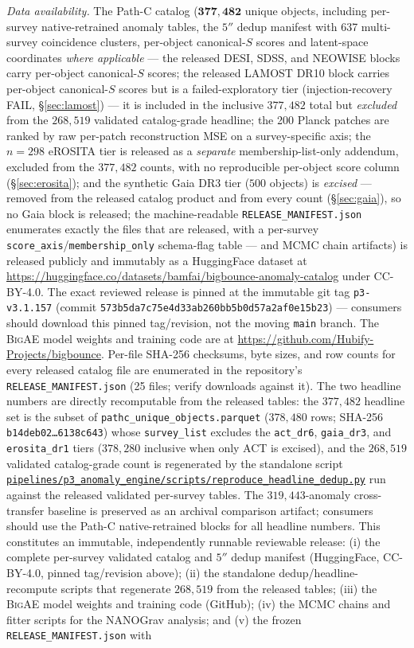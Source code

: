 \documentclass[aps,prd,twocolumn,superscriptaddress,showpacs,preprintnumbers,nofootinbib,longbibliography,floatfix]{revtex4-2}
\newcommand{\repoBase}{https://github.com/Hubify-Projects/bigbounce/blob/main}
\newcommand{\artifact}[1]{\href{\repoBase/#1}{\nolinkurl{#1}}}
\newcommand{\BigAE}{\textsc{BigAE}}
\begin{document}
\begin{acknowledgments}
\textit{Data availability.} The Path-C catalog ($\mathbf{377{,}482}$ unique objects, including per-survey native-retrained anomaly tables, the $5''$ dedup manifest with 637 multi-survey coincidence clusters, per-object canonical-$S$ scores and latent-space coordinates \emph{where applicable} --- the released DESI, SDSS, and NEOWISE blocks carry per-object canonical-$S$ scores; the released LAMOST DR10 block carries per-object canonical-$S$ scores but is a failed-exploratory tier (injection-recovery FAIL, \S\ref{sec:lamost}) --- it is included in the inclusive $377{,}482$ total but \emph{excluded} from the $268{,}519$ validated catalog-grade headline; the 200 Planck patches are ranked by raw per-patch reconstruction MSE on a survey-specific axis; the $n=298$ eROSITA tier is released as a \emph{separate} membership-list-only addendum, excluded from the $377{,}482$ counts, with no reproducible per-object score column (\S\ref{sec:erosita}); and the synthetic Gaia DR3 tier ($500$ objects) is \emph{excised} --- removed from the released catalog product and from every count (\S\ref{sec:gaia}), so no Gaia block is released; the machine-readable \texttt{RELEASE\_MANIFEST.json} enumerates exactly the files that are released, with a per-survey \texttt{score\_axis}/\texttt{membership\_only} schema-flag table --- and MCMC chain artifacts) is released publicly and immutably as a HuggingFace dataset at \url{https://huggingface.co/datasets/bamfai/bigbounce-anomaly-catalog} under CC-BY-4.0. The exact reviewed release is pinned at the immutable git tag \texttt{p3-v3.1.157} (commit \texttt{573b5da7c75e4d33ab260bb5b0d57a2af0e15b23}) --- consumers should download this pinned tag/revision, not the moving \texttt{main} branch. The \BigAE{} model weights and training code are at \url{https://github.com/Hubify-Projects/bigbounce}. Per-file SHA-256 checksums, byte sizes, and row counts for every released catalog file are enumerated in the repository's \texttt{RELEASE\_MANIFEST.json} (25 files; verify downloads against it). The two headline numbers are directly recomputable from the released tables: the $377{,}482$ headline set is the subset of \texttt{pathc\_unique\_objects.parquet} ($378{,}480$ rows; SHA-256 \texttt{b14deb02\ldots6138c643}) whose \texttt{survey\_list} excludes the \texttt{act\_dr6}, \texttt{gaia\_dr3}, and \texttt{erosita\_dr1} tiers ($378{,}280$ inclusive when only ACT is excised), and the $268{,}519$ validated catalog-grade count is regenerated by the standalone script \artifact{pipelines/p3\_anomaly\_engine/scripts/reproduce\_headline\_dedup.py} run against the released validated per-survey tables. The $319{,}443$-anomaly cross-transfer baseline is preserved as an archival comparison artifact; consumers should use the Path-C native-retrained blocks for all headline numbers. This constitutes an immutable, independently runnable reviewable release: (i) the complete per-survey validated catalog and $5''$ dedup manifest (HuggingFace, CC-BY-4.0, pinned tag/revision above); (ii) the standalone dedup/headline-recompute scripts that regenerate $268{,}519$ from the released tables; (iii) the \BigAE{} model weights and training code (GitHub); (iv) the MCMC chains and fitter scripts for the NANOGrav analysis; and (v) the frozen \texttt{RELEASE\_MANIFEST.json} with 
\end{acknowledgments}
\end{document}
